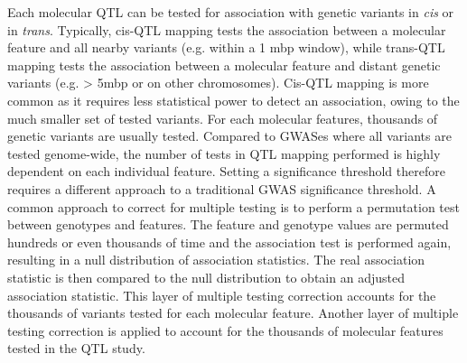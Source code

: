 Each molecular QTL can be tested for association with genetic variants in \textit{cis} or in \textit{trans}. Typically, cis-QTL mapping tests the association between a molecular feature and all nearby variants (e.g. within a 1 mbp window), while trans-QTL mapping tests the association between a molecular feature and distant genetic variants (e.g. > 5mbp or on other chromosomes). Cis-QTL mapping is more common as it requires less statistical power to detect an association, owing to the much smaller set of tested variants. For each molecular features, thousands of genetic variants are usually tested. Compared to GWASes where all variants are tested genome-wide, the number of tests in QTL mapping performed is highly dependent on each individual feature. Setting a significance threshold therefore requires a different approach to a traditional GWAS significance threshold. A common approach to correct for multiple testing is to perform a permutation test between genotypes and features. The feature and genotype values are permuted hundreds or even thousands of time and the association test is performed again, resulting in a null distribution of association statistics. The real association statistic is then compared to the null distribution to obtain an adjusted association statistic. This layer of multiple testing correction accounts for the thousands of variants tested for each molecular feature. Another layer of multiple testing correction is applied to account for the thousands of molecular features tested in the QTL study. \\

